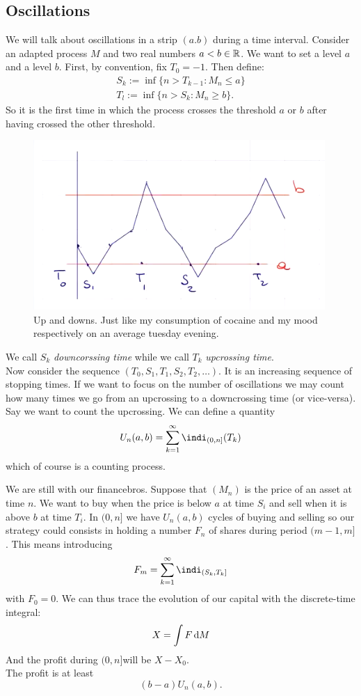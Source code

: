 \documentclass{report}
\begin{document}
\subsection{Oscillations}
We will talk about oscillations in a strip $(a.b)$ during a time interval. Consider an adapted process $M$ and two real numbers $a<b\in\mathbb{R}$. We want to set a level $a$ and a level $b$. First, by convention, fix $T_0=-1$. Then define:
\[\begin{array}{l}
	S_{k}:=\inf\{n>T_{k-1}:M_{n}\leq a\}\\
	T_{l}:=\inf\{n>S_{k}:M_{n}\geq b\}.
\end{array}\]
So it is the first time in which the process crosses the threshold $a$ or $b$ after having crossed the other threshold.
\begin{figure}[h]
	\centering
	\includegraphics[width=0.62\linewidth]{screenshot016}
	\caption{Up and downs. Just like my consumption of cocaine and my mood respectively on an average tuesday evening.}
	\label{fig:screenshot016}
\end{figure}
We call $S_{k}$\emph{ downcorssing time} while we call $T_{k}$ \emph{upcrossing time}. \\
Now consider the sequence $(T_0,S_1,T_1,S_2,T_2,\ldots)$. It is an increasing sequence of stopping times. If we want to focus on the number of oscillations we may count how many times we go from an upcrossing to a downcrossing time (or vice-versa). Say we want to count the upcrossing. We can define a quantity
\begin{equation*}
	U_{n}(a,b)=\sum_{k=1}^{\infty}\indi_{(0,n]}(T_{k})
\end{equation*}
which of course is a counting process.
\begin{example}
	We are still with our financebros. Suppose that $(M_{n})$ is the price of an asset at time $n$. We want to buy when the price is below $a$ at time $S_i$ and sell when it is above $b$ at time $T_i$. In $(0,n]$ we have $U_{n}(a,b)$ cycles of buying and selling so our strategy could consists in holding a number $F_{n}$ of shares during period $(m-1,m]$. This means introducing
	\[F_{m}=\sum_{k=1}^{\infty}\indi_{(S_{k},T_{k}]}\]
	with $F_{0}=0$. We can thus trace the evolution of our capital with the discrete-time integral:
	\[X=\int F\mathop{}\!\mathrm{d} M\]
	And the profit during $(0,n]$will be $X-X_{0}$.\\
	The profit is at least
	\begin{equation*}
		(b-a)U_{n}(a,b).
	\end{equation*}
\end{example}
\end{document}
